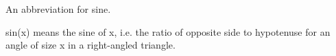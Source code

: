 An abbreviation for sine.
\par
sin(x) means the sine of x, i.e. the ratio of opposite side to hypotenuse
for an angle of size x in a right-angled triangle.
